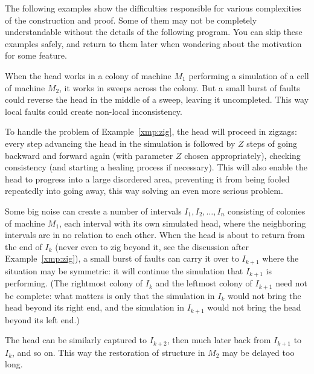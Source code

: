 \documentclass[11pt]{memoir}
\theoremstyle{definition} %
\newcommand{\Z}{Z} %
\begin{document}
The following examples show the difficulties responsible for various complexities of the
construction and proof.
Some of them may not be completely understandable without the details of the following program.
You can skip these examples safely, and return to them later when wondering
about the motivation for some feature.

\begin{example}\label{xmp:zig}
  When the head works in a colony of machine \( M_{1} \)
  performing a simulation of a cell of machine \( M_{2} \), it works in sweeps across the colony.
  But a small burst of faults could reverse the head in the middle of a sweep, leaving it uncompleted.
  This way local faults could create non-local inconsistency.

\end{example}

To handle the problem of Example~\ref{xmp:zig}, the head will proceed in zigzags: every
  step advancing the head in the simulation
  is followed by \( \Z \) steps 
  of going backward and forward again (with parameter \( \Z \) chosen appropriately), checking consistency
  (and starting a healing process if necessary).
  This will also enable the head to progress into a large
  disordered area, preventing it from being fooled repeatedly into going away, this way
  solving an even more serious problem.

\begin{example}\label{xmp:feather}
  Some big noise can create a number of intervals \( I_{1},I_{2},\dots,I_{n} \)
  consisting of colonies of machine \( M_{1} \), each interval with its own simulated head,
  where the neighboring intervals are in no relation to each other.
  When the head is about to return from the end of \( I_{k} \)
  (never even to zig beyond it, see the discussion after Example~\ref{xmp:zig}),
  a small burst of faults can carry it over to \( I_{k+1} \) where
  the situation may be symmetric: it will continue the simulation that \( I_{k+1} \) is performing.
  (The rightmost colony of \( I_{k} \) and the leftmost colony of \( I_{k+1} \) need not be complete:
  what matters is only that the simulation in \( I_{k} \) would not bring the head beyond its right end,
  and the simulation in \( I_{k+1} \) would not bring the head beyond its left end.)

  The head can be similarly captured to \( I_{k+2} \), then much later back from \( I_{k+1} \) to \( I_{k} \),
  and so on.
  This way the restoration of structure in \( M_{2} \) may be delayed too long.
\end{example}
\end{document}
